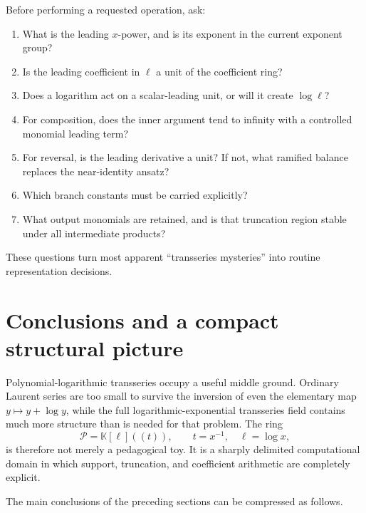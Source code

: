 \documentclass[11pt,oneside]{article}
\numberwithin{equation}{section}
\theoremstyle{definition}
\newcommand{\K}{\mathbb K}
\newcommand{\PL}{\mathscr P}
\begin{document}
Before performing a requested operation, ask:
\begin{enumerate}
\item What is the leading \(x\)-power, and is its exponent in the current
  exponent group?
\item Is the leading coefficient in \(\ell\) a unit of the coefficient ring?
\item Does a logarithm act on a scalar-leading unit, or will it create
  \(\log\ell\)?
\item For composition, does the inner argument tend to infinity with a
  controlled monomial leading term?
\item For reversal, is the leading derivative a unit?  If not, what ramified
  balance replaces the near-identity ansatz?
\item Which branch constants must be carried explicitly?
\item What output monomials are retained, and is that truncation region stable
  under all intermediate products?
\end{enumerate}
These questions turn most apparent ``transseries mysteries'' into routine
representation decisions.

\section{Conclusions and a compact structural picture}\label{sec:conclusion}

Polynomial-logarithmic transseries occupy a useful middle ground.  Ordinary
Laurent series are too small to survive the inversion of even the elementary
map \(y\mapsto y+\log y\), while the full logarithmic-exponential transseries
field contains much more structure than is needed for that problem.  The ring
\[
  \PL=\K[\ell]((t)),\qquad t=x^{-1},\quad \ell=\log x,
\]
is therefore not merely a pedagogical toy.  It is a sharply delimited
computational domain in which support, truncation, and coefficient arithmetic
are completely explicit.

The main conclusions of the preceding sections can be compressed as follows.
\end{document}
